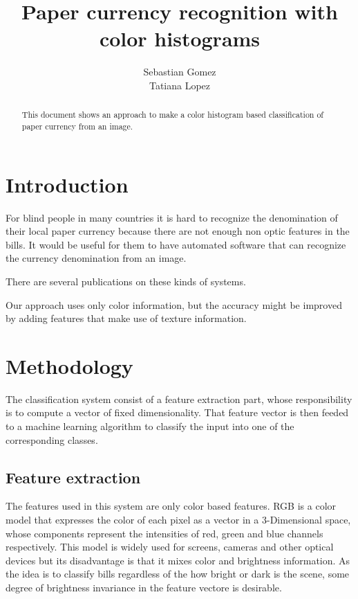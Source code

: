 \documentclass{article}
\begin{document}
\title{Paper currency recognition with color histograms}
\author{Sebastian Gomez \\ Tatiana Lopez}
\maketitle

\begin{abstract}
This document shows an approach to make a color histogram based classification of paper currency from an image.
\end{abstract}

\section{Introduction}
For blind people in many countries it is hard to recognize the denomination of their local paper currency because
there are not enough non optic features in the bills. It would be useful for them to have automated software that
can recognize the currency denomination from an image.

There are several publications on these kinds of systems. %

Our approach uses only color information, but the accuracy might be improved by adding features that make use of
texture information.

\section{Methodology}

The classification system consist of a feature extraction part, whose responsibility is to compute a vector of
fixed dimensionality. That feature vector is then feeded to a machine learning algorithm to classify the input
into one of the corresponding classes.

\subsection{Feature extraction}

The features used in this system are only color based features. RGB is a color model that expresses the color of
each pixel as a vector in a 3-Dimensional space, whose components represent the intensities of red, green and blue
channels respectively. This model is widely used for screens, cameras and other optical devices but its disadvantage is 
that it mixes color and brightness information. As the idea is to classify bills regardless of the how bright or 
dark is the scene, some degree of brightness invariance in the feature vectore is desirable.
\end{document}
